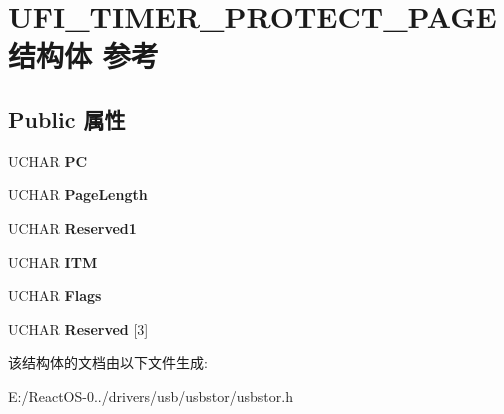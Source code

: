 \hypertarget{struct_u_f_i___t_i_m_e_r___p_r_o_t_e_c_t___p_a_g_e}{}\section{U\+F\+I\+\_\+\+T\+I\+M\+E\+R\+\_\+\+P\+R\+O\+T\+E\+C\+T\+\_\+\+P\+A\+G\+E结构体 参考}
\label{struct_u_f_i___t_i_m_e_r___p_r_o_t_e_c_t___p_a_g_e}
\subsection*{Public 属性}
\begin{DoxyCompactItemize}
\item 
\mbox{\label{struct_u_f_i___t_i_m_e_r___p_r_o_t_e_c_t___p_a_g_e_a99f85568ceb98cf18e59691f73677307}} 
U\+C\+H\+AR {\bfseries PC}
\item 
\mbox{\label{struct_u_f_i___t_i_m_e_r___p_r_o_t_e_c_t___p_a_g_e_ac926e050d14b8556ed8839a8480d43f2}} 
U\+C\+H\+AR {\bfseries Page\+Length}
\item 
\mbox{\label{struct_u_f_i___t_i_m_e_r___p_r_o_t_e_c_t___p_a_g_e_ab265301c1f21e669d1adef1ada5921b2}} 
U\+C\+H\+AR {\bfseries Reserved1}
\item 
\mbox{\label{struct_u_f_i___t_i_m_e_r___p_r_o_t_e_c_t___p_a_g_e_af359195a3b929d4a62800611375f9dff}} 
U\+C\+H\+AR {\bfseries I\+TM}
\item 
\mbox{\label{struct_u_f_i___t_i_m_e_r___p_r_o_t_e_c_t___p_a_g_e_a3c51fb4c298d7cf110561e6f3468b13d}} 
U\+C\+H\+AR {\bfseries Flags}
\item 
\mbox{\label{struct_u_f_i___t_i_m_e_r___p_r_o_t_e_c_t___p_a_g_e_abed0c1cdf050f58b26e82ccae0fefe68}} 
U\+C\+H\+AR {\bfseries Reserved} \mbox{[}3\mbox{]}
\end{DoxyCompactItemize}


该结构体的文档由以下文件生成\+:\begin{DoxyCompactItemize}
\item 
E\+:/\+React\+O\+S-\/0../drivers/usb/usbstor/usbstor.\+h\end{DoxyCompactItemize}
